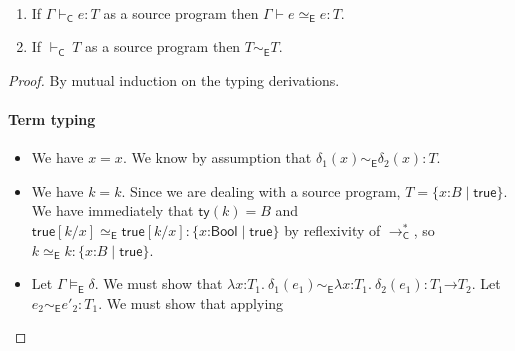 \documentclass[9pt]{extarticle}
\newcommand{\ottnt}[1]{\mathit{#1}}
\newcommand{\ottsym}[1]{#1}
\begin{document}
\begin{lemma}
  \label{lem:eideticlr}
  ~

  \noindent
  \begin{enumerate}
  \item \label{elr:term} If $ \Gamma   \vdash _{  \mathsf{C}  }  \ottnt{e}  :  \ottnt{T} $ as a source program then
    $ \Gamma   \vdash   \ottnt{e}   \simeq _{  \mathsf{E}  }  \ottnt{e}  :  \ottnt{T} $.
  \item \label{elr:type} If $ \mathord{  \vdash _{  \mathsf{C}  } }~ \ottnt{T} $ as a source program then $ \ottnt{T}   \sim _{  \mathsf{E}  }  \ottnt{T} $.
  \end{enumerate}
\begin{proof}
    By mutual induction on the typing derivations.
{\iffull
    \paragraph{Term typing \fbox{$ \Gamma   \vdash _{  \mathsf{C}  }  \ottnt{e}  :  \ottnt{T} $}}
    \begin{itemize}
    \item[\T{Var}] We have $\mathit{x}  \ottsym{=}  \mathit{x}$. We know by assumption
      that $ \delta_{{\mathrm{1}}}  \ottsym{(}  \mathit{x}  \ottsym{)}   \sim _{  \mathsf{E}  }  \delta_{{\mathrm{2}}}  \ottsym{(}  \mathit{x}  \ottsym{)}  :  \ottnt{T} $.
    \item[\T{Const}] We have $\ottnt{k}  \ottsym{=}  \ottnt{k}$. Since we are dealing
      with a source program, $\ottnt{T}  \ottsym{=}   \{ \mathit{x} \mathord{:} \ottnt{B} \mathrel{\mid}  \mathsf{true}  \} $. We have immediately
      that $ \mathsf{ty} ( \ottnt{k} )   \ottsym{=}  \ottnt{B}$ and $   \mathsf{true}   [  \ottnt{k} / \mathit{x}  ]    \simeq _{  \mathsf{E}  }    \mathsf{true}   [  \ottnt{k} / \mathit{x}  ]   :   \{ \mathit{x} \mathord{:}  \mathsf{Bool}  \mathrel{\mid}  \mathsf{true}  \}  $ by reflexivity of $ \longrightarrow ^{*}_{  \mathsf{C}  } $, so $ \ottnt{k}   \simeq _{  \mathsf{E}  }  \ottnt{k}  :   \{ \mathit{x} \mathord{:} \ottnt{B} \mathrel{\mid}  \mathsf{true}  \}  $.
    \item[\T{Abs}] Let $ \Gamma   \models _{  \mathsf{E}  }  \delta $. We must show that
      $  \lambda \mathit{x} \mathord{:} \ottnt{T_{{\mathrm{1}}}} .~  \delta_{{\mathrm{1}}}  \ottsym{(}  \ottnt{e_{{\mathrm{1}}}}  \ottsym{)}    \sim _{  \mathsf{E}  }   \lambda \mathit{x} \mathord{:} \ottnt{T_{{\mathrm{1}}}} .~  \delta_{{\mathrm{2}}}  \ottsym{(}  \ottnt{e_{{\mathrm{1}}}}  \ottsym{)}   :   \ottnt{T_{{\mathrm{1}}}} \mathord{ \rightarrow } \ottnt{T_{{\mathrm{2}}}}  $. Let $ \ottnt{e_{{\mathrm{2}}}}   \sim _{  \mathsf{E}  }  \ottnt{e'_{{\mathrm{2}}}}  :  \ottnt{T_{{\mathrm{1}}}} $. We must show that applying

\end{itemize}}
\end{proof}
\end{lemma}
\end{document}
